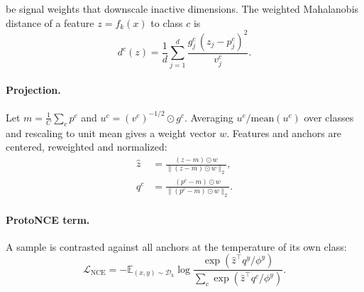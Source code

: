 be signal weights that downscale inactive dimensions. The weighted Mahalanobis distance of a feature $z=f_k(x)$ to class $c$ is
\begin{equation}
  d^c(z)=\frac{1}{d}\sum_{j=1}^{d}\frac{g^c_j\,(z_j-p^c_j)^2}{v^c_j}.
  \label{eq:dist}
\end{equation}

\paragraph{Projection.}
Let $m=\frac{1}{C}\sum_c p^c$ and $u^c=(v^c)^{-1/2}\odot g^c$. Averaging $u^c/\mathrm{mean}(u^c)$ over classes and rescaling to unit mean gives a weight vector $w$. Features and anchors are centered, reweighted and normalized:
\begin{equation}
\begin{aligned}
  \hat z&=\frac{(z-m)\odot w}{\|(z-m)\odot w\|_2},\\
  q^c&=\frac{(p^c-m)\odot w}{\|(p^c-m)\odot w\|_2}.
\end{aligned}
\label{eq:proj}
\end{equation}

\paragraph{ProtoNCE term.}
A sample is contrasted against all anchors at the temperature of its own class:
\begin{equation}
  \mathcal{L}_{\mathrm{NCE}}=-\mathbb{E}_{(x,y)\sim\mathcal{D}_k}\log\frac{\exp(\hat z^{\top}q^y/\phi^y)}{\sum_{c}\exp(\hat z^{\top}q^c/\phi^y)}.
  \label{eq:nce}
\end{equation}

